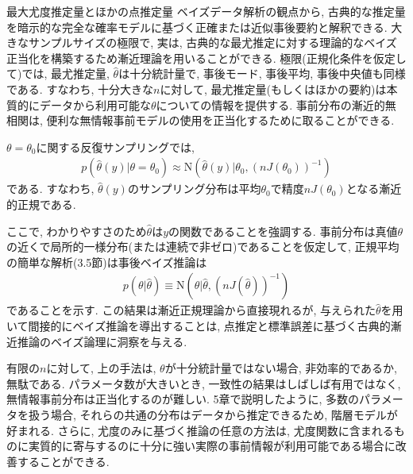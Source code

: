 \documentclass[10pt,dvipdfmx,a4]{beamer}
\newcommand{\eqn}[1]{\begin{align*}#1\end{align*}}
\begin{document}

\begin{frame}{最大尤度推定量とほかの点推定量}
ベイズデータ解析の観点から, 古典的な推定量を暗示的な完全な確率モデルに基づく正確または近似事後要約と解釈できる.
大きなサンプルサイズの極限で, 実は, 古典的な最尤推定に対する理論的なベイズ正当化を構築するため漸近理論を用いることができる.
極限(正規化条件を仮定して)では, 最尤推定量, $\hat{\theta}$は十分統計量で, 事後モード, 事後平均, 事後中央値も同様である.
すなわち, 十分大きな$n$に対して, 最尤推定量(もしくはほかの要約)は本質的にデータから利用可能な$\theta$についての情報を提供する.
事前分布の漸近的無相関は, 便利な無情報事前モデルの使用を正当化するために取ることができる.

$\theta=\theta_0$に関する反復サンプリングでは,
\eqn{p(\hat{\theta}(y)|\theta=\theta_0)\approx\text{N}(\hat{\theta}(y)|\theta_0, (nJ(\theta_0))^{-1})}
である.
すなわち, $\hat{\theta}(y)$のサンプリング分布は平均$\theta_0$で精度$nJ(\theta_0)$となる漸近的正規である.
\end{frame}


\begin{frame}
ここで, わかりやすさのため$\hat{\theta}$は$y$の関数であることを強調する.
事前分布は真値$\theta$の近くで局所的一様分布(または連続で非ゼロ)であることを仮定して, 正規平均の簡単な解析(3.5節)は事後ベイズ推論は
\eqn{p(\theta|\hat{\theta})\equiv \text{N}(\theta|\hat{\theta}, (nJ(\hat{\theta}))^{-1})}
であることを示す.
この結果は漸近正規理論から直接現れるが, 与えられた$\hat{\theta}$を用いて間接的にベイズ推論を導出することは, 点推定と標準誤差に基づく古典的漸近推論のベイズ論理に洞察を与える.

有限の$n$に対して, 上の手法は, $\theta$が十分統計量ではない場合, 非効率的であるか, 無駄である.
パラメータ数が大きいとき, 一致性の結果はしばしば有用ではなく, 無情報事前分布は正当化するのが難しい.
5章で説明したように, 多数のパラメータを扱う場合, それらの共通の分布はデータから推定できるため, 階層モデルが好まれる.
さらに, 尤度のみに基づく推論の任意の方法は, 尤度関数に含まれるものに実質的に寄与するのに十分に強い実際の事前情報が利用可能である場合に改善することができる.
\end{frame}

\end{document}
